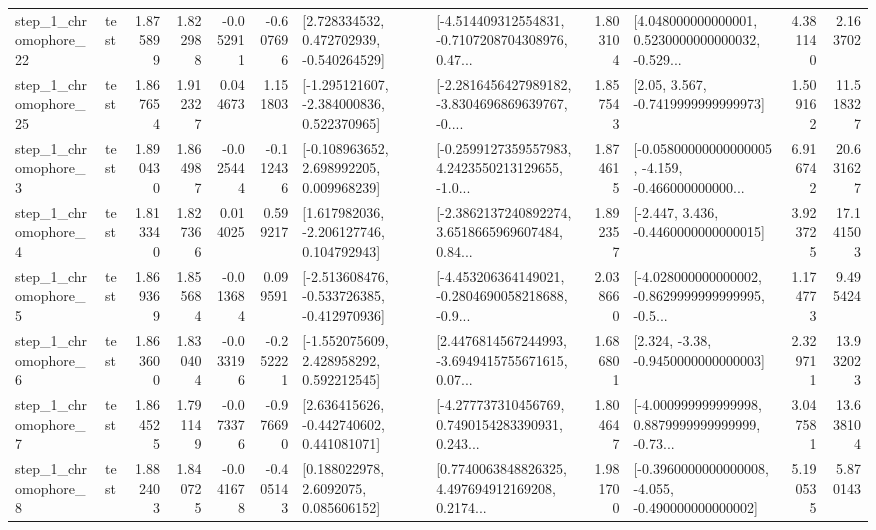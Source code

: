 \begin{tabular}{llrrrrllrlrr}
    step\_1\_chromophore\_22 &      test &      1.875899 &    1.822988 &     -0.052911 & -0.607696 &    [2.728334532, 0.472702939, -0.540264529] &  [-4.514409312554831, -0.7107208704308976, 0.47... &       1.803104 &  [4.048000000000001, 0.5230000000000032, -0.529... &            4.381140 &          2.163702 \\
    step\_1\_chromophore\_25 &      test &      1.867654 &    1.912327 &      0.044673 &  1.151803 &   [-1.295121607, -2.384000836, 0.522370965] &  [-2.2816456427989182, -3.8304696869639767, -0.... &       1.857543 &                 [2.05, 3.567, -0.7419999999999973] &            1.509162 &         11.518327 \\
     step\_1\_chromophore\_3 &      test &      1.890430 &    1.864987 &     -0.025444 & -0.112436 &    [-0.108963652, 2.698992205, 0.009968239] &  [-0.2599127359557983, 4.2423550213129655, -1.0... &       1.874615 &  [-0.05800000000000005, -4.159, -0.466000000000... &            6.916742 &         20.631627 \\
     step\_1\_chromophore\_4 &      test &      1.813340 &    1.827366 &      0.014025 &  0.599217 &    [1.617982036, -2.206127746, 0.104792943] &  [-2.3862137240892274, 3.6518665969607484, 0.84... &       1.892357 &               [-2.447, 3.436, -0.4460000000000015] &            3.923725 &         17.141503 \\
     step\_1\_chromophore\_5 &      test &      1.869369 &    1.855684 &     -0.013684 &  0.099591 &  [-2.513608476, -0.533726385, -0.412970936] &  [-4.453206364149021, -0.2804690058218688, -0.9... &       2.038660 &  [-4.028000000000002, -0.8629999999999995, -0.5... &            1.174773 &          9.495424 \\
     step\_1\_chromophore\_6 &      test &      1.863600 &    1.830404 &     -0.033196 & -0.252221 &    [-1.552075609, 2.428958292, 0.592212545] &  [2.4476814567244993, -3.6949415755671615, 0.07... &       1.686801 &                [2.324, -3.38, -0.9450000000000003] &            2.329711 &         13.932023 \\
     step\_1\_chromophore\_7 &      test &      1.864525 &    1.791149 &     -0.073376 & -0.976690 &    [2.636415626, -0.442740602, 0.441081071] &  [-4.277737310456769, 0.7490154283390931, 0.243... &       1.804647 &  [-4.000999999999998, 0.8879999999999999, -0.73... &            3.047581 &         13.638104 \\
     step\_1\_chromophore\_8 &      test &      1.882403 &    1.840725 &     -0.041678 & -0.405143 &       [0.188022978, 2.6092075, 0.085606152] &  [0.7740063848826325, 4.497694912169208, 0.2174... &       1.981700 &  [-0.3960000000000008, -4.055, -0.490000000000002] &            5.190535 &          5.870143 \\

\end{tabular}

